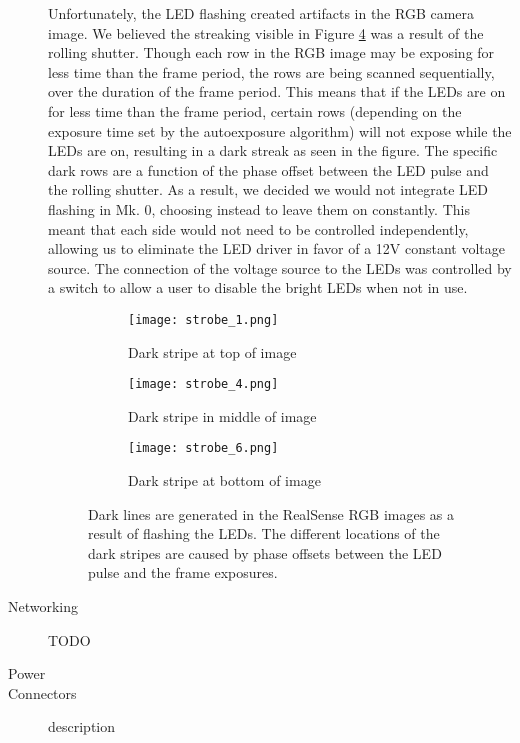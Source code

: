 \begin{description}
	Unfortunately, the LED flashing created artifacts in the RGB camera image. We believed the streaking visible in Figure \ref{strobe_images} was a result of the rolling shutter. Though each row in the RGB image may be exposing for less time than the frame period, the rows are being scanned sequentially, over the duration of the frame period. This means that if the LEDs are on for less time than the frame period, certain rows (depending on the exposure time set by the autoexposure algorithm) will not expose while the LEDs are on, resulting in a dark streak as seen in the figure. The specific dark rows are a function of the phase offset between the LED pulse and the rolling shutter. As a result, we decided we would not integrate LED flashing in Mk. 0, choosing instead to leave them on constantly. This meant that each side would not need to be controlled independently, allowing us to eliminate the LED driver in favor of a 12V constant voltage source. The connection of the voltage source to the LEDs was controlled by a switch to allow a user to disable the bright LEDs when not in use.
			
	\begin{figure}
		\centering
		\begin{subfigure}{0.3\textwidth}
			\texttt{[image: strobe\_1.png]}
			\caption{Dark stripe at top of image}
			\label{strobe_top}
		\end{subfigure}		
		\hfill
		\begin{subfigure}{0.3\textwidth}
			\texttt{[image: strobe\_4.png]}
			\caption{Dark stripe in middle of image}
			\label{strobe_middle}		
		\end{subfigure}
		\hfill
		\begin{subfigure}{0.3\textwidth}
			\texttt{[image: strobe\_6.png]}
			\caption{Dark stripe at bottom of image}
			\label{strobe_bottom}
		\end{subfigure}	
		\caption[Dark lines in RealSense RGB images with LED flashing]{Dark lines are generated in the RealSense RGB images as a result of flashing the LEDs. The different locations of the dark stripes are caused by phase offsets between the LED pulse and the frame exposures.}
		\label{strobe_images}
	\end{figure}	
			
			
	\item[Networking] TODO
	\item[Power]
	\item[Connectors] description
\end{description}

